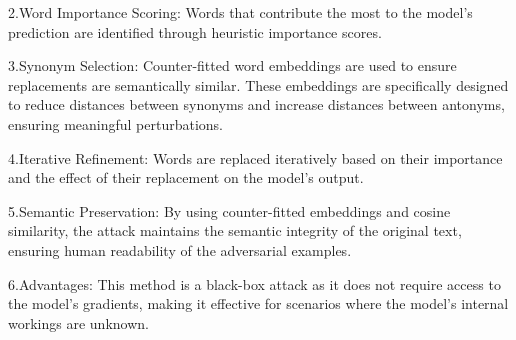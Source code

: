 2.Word Importance Scoring: Words that contribute the most to the model's prediction are identified through heuristic importance scores.  

3.Synonym Selection: Counter-fitted word embeddings are used to ensure replacements are semantically similar. These embeddings are specifically designed to reduce distances between synonyms and increase distances between antonyms, ensuring meaningful perturbations.  

4.Iterative Refinement: Words are replaced iteratively based on their importance and the effect of their replacement on the model's output.  

5.Semantic Preservation: By using counter-fitted embeddings and cosine similarity, the attack maintains the semantic integrity of the original text, ensuring human readability of the adversarial examples.  

6.Advantages: This method is a black-box attack as it does not require access to the model’s gradients, making it effective for scenarios where the model's internal workings are unknown.
